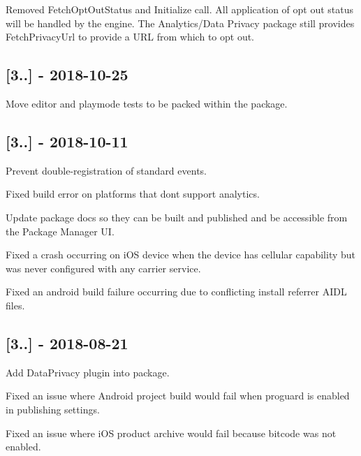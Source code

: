 
\begin{DoxyItemize}
\item Removed Fetch\+Opt\+Out\+Status and Initialize call. All application of opt out status will be handled by the engine. The Analytics/\+Data Privacy package still provides Fetch\+Privacy\+Url to provide a U\+RL from which to opt out.
\end{DoxyItemize}

\subsection*{\mbox{[}3..\mbox{]} -\/ 2018-\/10-\/25}


\begin{DoxyItemize}
\item Move editor and playmode tests to be packed within the package.
\end{DoxyItemize}

\subsection*{\mbox{[}3..\mbox{]} -\/ 2018-\/10-\/11}


\begin{DoxyItemize}
\item Prevent double-\/registration of standard events.
\item Fixed build error on platforms that don\textquotesingle{}t support analytics.
\item Update package docs so they can be built and published and be accessible from the Package Manager UI.
\item Fixed a crash occurring on i\+OS device when the device has cellular capability but was never configured with any carrier service.
\item Fixed an android build failure occurring due to conflicting install referrer A\+I\+DL files.
\end{DoxyItemize}

\subsection*{\mbox{[}3..\mbox{]} -\/ 2018-\/08-\/21}


\begin{DoxyItemize}
\item Add Data\+Privacy plugin into package.
\item Fixed an issue where Android project build would fail when proguard is enabled in publishing settings.
\item Fixed an issue where i\+OS product archive would fail because bitcode was not enabled.
\end{DoxyItemize}

